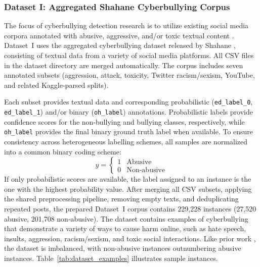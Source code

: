 \subsubsection{Dataset I: Aggregated Shahane Cyberbullying Corpus}
The focus of cyberbullying detection research is to utilize existing social media corpora annotated with abusive, aggressive, and/or toxic textual content \cite{ref1, ref12, ref27}. Dataset~I uses the aggregated cyberbullying dataset released by Shahane \cite{ref10}, consisting of textual data from a variety of social media platforms. All CSV files in the dataset directory are merged automatically. The corpus includes seven annotated subsets (aggression, attack, toxicity, Twitter racism/sexism, YouTube, and related Kaggle-parsed splits).

Each subset provides textual data and corresponding probabilistic (\texttt{ed\_label\_0}, \texttt{ed\_label\_1}) and/or binary (\texttt{oh\_label}) annotations. Probabilistic labels provide confidence scores for the non-bullying and bullying classes, respectively, while \texttt{oh\_label} provides the final binary ground truth label when available. To ensure consistency across heterogeneous labelling schemes, all samples are normalized into a common binary coding scheme:
\begin{equation}
y =
\begin{cases}
1 & \text{Abusive} \\
0 & \text{Non-abusive}
\end{cases}
\end{equation}
If only probabilistic scores are available, the label assigned to an instance is the one with the highest probability value. After merging all CSV subsets, applying the shared preprocessing pipeline, removing empty texts, and deduplicating repeated posts, the prepared Dataset~I corpus contains 229{,}228 instances (27{,}520 abusive, 201{,}708 non-abusive). The dataset contains examples of cyberbullying that demonstrate a variety of ways to cause harm online, such as hate speech, insults, aggression, racism/sexism, and toxic social interactions. Like prior work \cite{ref12}, the dataset is imbalanced, with non-abusive instances outnumbering abusive instances. Table~\ref{tab:dataset_examples} illustrates sample instances.

